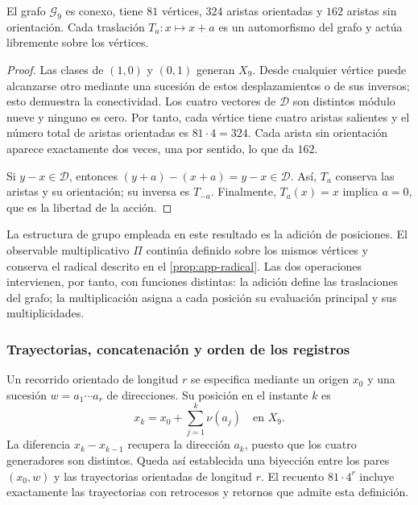 \begin{proposicion}
\label{geo:prop-cayley}
El grafo $\mathscr G_9$ es conexo, tiene $81$ vértices, $324$ aristas orientadas y $162$ aristas sin orientación. Cada traslación $T_a:x\mapsto x+a$ es un automorfismo del grafo y actúa libremente sobre los vértices.
\end{proposicion}

\begin{proof}
Las clases de $(1,0)$ y $(0,1)$ generan $X_9$. Desde cualquier vértice puede alcanzarse otro mediante una sucesión de estos desplazamientos o de sus inversos; esto demuestra la conectividad. Los cuatro vectores de $\mathscr D$ son distintos módulo nueve y ninguno es cero. Por tanto, cada vértice tiene cuatro aristas salientes y el número total de aristas orientadas es $81\cdot4=324$. Cada arista sin orientación aparece exactamente dos veces, una por sentido, lo que da $162$.

Si $y-x\in\mathscr D$, entonces $(y+a)-(x+a)=y-x\in\mathscr D$. Así, $T_a$ conserva las aristas y su orientación; su inversa es $T_{-a}$. Finalmente, $T_a(x)=x$ implica $a=0$, que es la libertad de la acción.
\end{proof}

La estructura de grupo empleada en este resultado es la adición de posiciones. El observable multiplicativo $\Pi$ continúa definido sobre los mismos vértices y conserva el radical descrito en el \cref{prop:app-radical}. Las dos operaciones intervienen, por tanto, con funciones distintas: la adición define las traslaciones del grafo; la multiplicación asigna a cada posición su evaluación principal y sus multiplicidades.

\subsubsection{Trayectorias, concatenación y orden de los registros}

Un recorrido orientado de longitud $r$ se especifica mediante un origen $x_0$ y una sucesión $w=a_1\cdots a_r$ de direcciones. Su posición en el instante $k$ es
\[
 x_k=x_0+\sum_{j=1}^{k}\nu(a_j)\quad\text{en }X_9.
\]
La diferencia $x_k-x_{k-1}$ recupera la dirección $a_k$, puesto que los cuatro generadores son distintos. Queda así establecida una biyección entre los pares $(x_0,w)$ y las trayectorias orientadas de longitud $r$. El recuento $81\cdot4^r$ incluye exactamente las trayectorias con retrocesos y retornos que admite esta definición.

